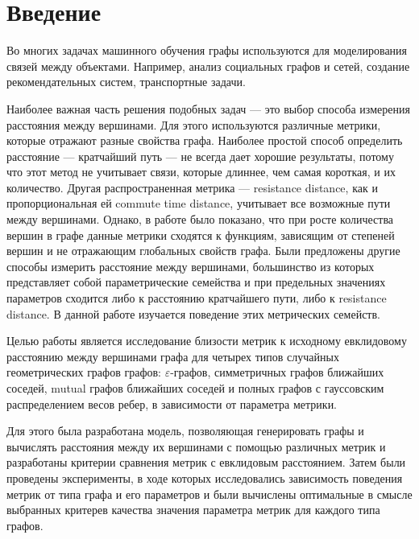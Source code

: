 \chapter*{Введение}							%

Во многих задачах машинного обучения графы используются для моделирования связей между объектами. Например, анализ социальных графов и сетей, создание рекомендательных систем, транспортные задачи.

Наиболее важная часть решения подобных задач --- это выбор способа измерения расстояния между вершинами. Для этого используются различные метрики, которые отражают разные свойства графа. Наиболее простой способ определить расстояние --- кратчайший путь --- не всегда дает хорошие результаты, потому что этот метод не учитывает связи, которые длиннее, чем самая короткая, и их количество. Другая распространенная метрика --- resistance distance, как и пропорциональная ей commute time distance, учитывает все возможные пути между вершинами. Однако, в работе \cite{von2014hitting} было показано, что при росте количества вершин в графе данные метрики сходятся к функциям, зависящим от степеней вершин и не отражающим глобальных свойств графа. Были предложены другие способы измерить расстояние между вершинами, большинство из которых представляет собой параметрические семейства и при предельных значениях параметров сходится либо к расстоянию кратчайшего пути, либо к resistance distance. В данной работе изучается поведение этих метрических семейств.

Целью работы является исследование близости метрик к исходному евклидовому расстоянию между вершинами графа для четырех типов случайных геометрических графов графов:  $\varepsilon$-графов, симметричных графов ближайших соседей, mutual графов ближайших соседей и полных графов с гауссовским распределением весов ребер, в зависимости от параметра метрики.

Для этого была разработана модель, позволяющая генерировать графы и вычислять расстояния между их вершинами с помощью различных метрик и разработаны критерии сравнения метрик с евклидовым расстоянием. Затем были проведены эксперименты, в ходе которых исследовались зависимость поведения метрик от типа графа и его параметров и были вычислены оптимальные в смысле выбранных критерев качества значения параметра метрик для каждого типа графов.


\clearpage